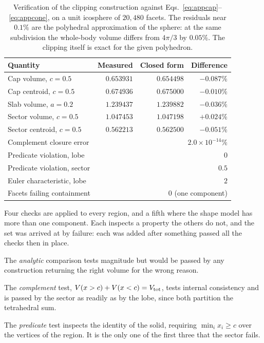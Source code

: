 \begin{table}[htbp]
\centering
\caption{Verification of the clipping construction against
Eqs.~\eqref{eq:appcap}--\eqref{eq:appcone}, on a unit icosphere of $20{,}480$
facets. The residuals near $0.1\%$ are the polyhedral approximation of the
sphere: at the same subdivision the whole-body volume differs from $4\pi/3$ by
$0.05\%$. The clipping itself is exact for the given polyhedron.}
\label{tab:appverify}
\begin{tabular}{lrrr}
\toprule
Quantity & Measured & Closed form & Difference \\
\midrule
Cap volume, $c = 0.5$        & $0.653931$ & $0.654498$ & $-0.087\%$ \\
Cap centroid, $c = 0.5$      & $0.674936$ & $0.675000$ & $-0.010\%$ \\
Slab volume, $a = 0.2$       & $1.239437$ & $1.239882$ & $-0.036\%$ \\
Sector volume, $c = 0.5$     & $1.047453$ & $1.047198$ & $+0.024\%$ \\
Sector centroid, $c = 0.5$   & $0.562213$ & $0.562500$ & $-0.051\%$ \\
\midrule
Complement closure error     & \multicolumn{3}{r}{$2.0\times10^{-14}\%$} \\
Predicate violation, lobe    & \multicolumn{3}{r}{$0$} \\
Predicate violation, sector  & \multicolumn{3}{r}{$0.5$} \\
Euler characteristic, lobe   & \multicolumn{3}{r}{$2$} \\
Facets failing containment   & \multicolumn{3}{r}{$0$ (one component)} \\
\bottomrule
\end{tabular}
\end{table}

Four checks are applied to every region, and a fifth where the shape model
has more than one component. Each inspects a property the others do not, and
the set was arrived at by failure: each was added after something passed all
the checks then in place.

The \emph{analytic} comparison tests magnitude but would be passed by any
construction returning the right volume for the wrong reason.

The \emph{complement} test, $V(x>c) + V(x<c) = V_{\mathrm{tot}}$, tests internal
consistency and is passed by the sector as readily as by the lobe, since both
partition the tetrahedral sum.

The \emph{predicate} test inspects the identity of the solid, requiring
$\min_i x_i \ge c$ over the vertices of the region. It is the only one of the
first three that the sector fails.

